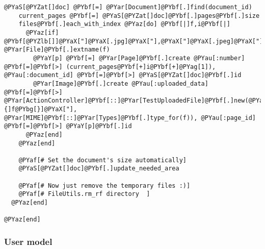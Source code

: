 \begin{Verbatim}[commandchars=@\[\]]
    @PYaS[@PYZat[]doc] @PYbf[=] @PYar[Document]@PYbf[.]find(document_id)
    current_pages @PYbf[=] @PYaS[@PYZat[]doc]@PYbf[.]pages@PYbf[.]size
    files@PYbf[.]each_with_index @PYaz[do] @PYbf[|]f,i@PYbf[|]
      @PYaz[if] @PYbf[@PYZlb[]]@PYaX["]@PYaX[.jpg]@PYaX["],@PYaX["]@PYaX[.jpeg]@PYaX["],@PYaX["]@PYaX[.gif]@PYaX["],@PYaX["]@PYaX[.png]@PYaX["]@PYbf[@PYZrb[]]@PYbf[.]include? @PYar[File]@PYbf[.]extname(f)
        @PYaY[p] @PYbf[=] @PYar[Page]@PYbf[.]create @PYau[:number] @PYbf[=]@PYbf[>] (current_pages@PYbf[+]i@PYbf[+]@PYag[1]), @PYau[:document_id] @PYbf[=]@PYbf[>] @PYaS[@PYZat[]doc]@PYbf[.]id
        @PYar[Image]@PYbf[.]create @PYau[:uploaded_data] @PYbf[=]@PYbf[>] @PYar[ActionController]@PYbf[::]@PYar[TestUploadedFile]@PYbf[.]new(@PYaX["]@PYbg[#{]f@PYbg[}]@PYaX["], @PYar[MIME]@PYbf[::]@PYar[Types]@PYbf[.]type_for(f)), @PYau[:page_id] @PYbf[=]@PYbf[>] @PYaY[p]@PYbf[.]id
      @PYaz[end]
    @PYaz[end]
    
    @PYaf[# Set the document's size automatically]
    @PYaS[@PYZat[]doc]@PYbf[.]update_needed_area

    @PYaf[# Now just remove the temporary files :)]
    @PYaf[# FileUtils.rm_rf directory  ]
  @PYaz[end]
  
@PYaz[end]
\end{Verbatim}



\subsubsection{User model} %
\label{ssub:user_model}

